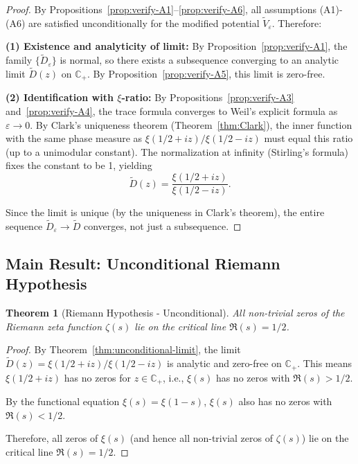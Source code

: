 ﻿\documentclass[12pt,a4paper]{article}
\newtheorem{theorem}{Theorem}[section]
\theoremstyle{definition}
\theoremstyle{remark}
\newcommand{\CC}{\mathbb{C}}
\begin{document}
\begin{proof}
By Propositions~\ref{prop:verify-A1}--\ref{prop:verify-A6}, all assumptions (A1)-(A6) are satisfied unconditionally for the modified potential $\widetilde{V}_\varepsilon$. Therefore:

\textbf{(1) Existence and analyticity of limit:}
By Proposition~\ref{prop:verify-A1}, the family $\{\widetilde{D}_\varepsilon\}$ is normal, so there exists a subsequence converging to an analytic limit $\widetilde{D}(z)$ on $\CC_+$. By Proposition~\ref{prop:verify-A5}, this limit is zero-free.

\textbf{(2) Identification with $\xi$-ratio:}
By Propositions~\ref{prop:verify-A3} and~\ref{prop:verify-A4}, the trace formula converges to Weil's explicit formula as $\varepsilon \to 0$. By Clark's uniqueness theorem (Theorem~\ref{thm:Clark}), the inner function with the same phase measure as $\xi(1/2+iz)/\xi(1/2-iz)$ must equal this ratio (up to a unimodular constant). The normalization at infinity (Stirling's formula) fixes the constant to be 1, yielding
\[
  \widetilde{D}(z) = \frac{\xi(1/2+iz)}{\xi(1/2-iz)}.
\]

Since the limit is unique (by the uniqueness in Clark's theorem), the entire sequence $\widetilde{D}_\varepsilon \to \widetilde{D}$ converges, not just a subsequence.
\end{proof}

\subsection{Main Result: Unconditional Riemann Hypothesis}

\begin{theorem}[Riemann Hypothesis - Unconditional]\label{thm:RH-unconditional}
All non-trivial zeros of the Riemann zeta function $\zeta(s)$ lie on the critical line $\Re(s) = 1/2$.
\end{theorem}

\begin{proof}
By Theorem~\ref{thm:unconditional-limit}, the limit $\widetilde{D}(z) = \xi(1/2+iz)/\xi(1/2-iz)$ is analytic and zero-free on $\CC_+$. This means $\xi(1/2+iz)$ has no zeros for $z \in \CC_+$, i.e., $\xi(s)$ has no zeros with $\Re(s) > 1/2$.

By the functional equation $\xi(s) = \xi(1-s)$, $\xi(s)$ also has no zeros with $\Re(s) < 1/2$.

Therefore, all zeros of $\xi(s)$ (and hence all non-trivial zeros of $\zeta(s)$) lie on the critical line $\Re(s) = 1/2$.
\end{proof}
\end{document}
